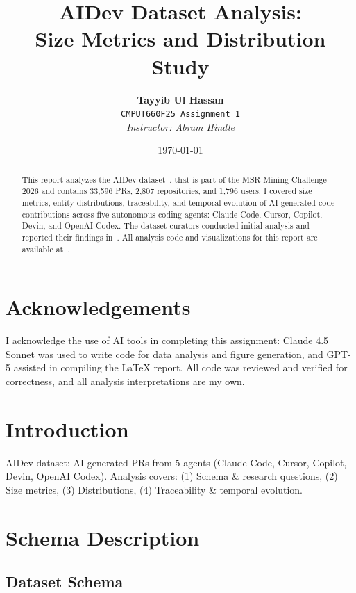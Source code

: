 \documentclass[11pt]{article}
\title{\textbf{AIDev Dataset Analysis:\\Size Metrics and Distribution Study}}
\author{
    \textbf{Tayyib Ul Hassan}\\
    \texttt{CMPUT660F25 Assignment 1}\\[0.5em]
    \textit{Instructor: Abram Hindle}
}
\date{\today}
\begin{document}
\maketitle

\begin{abstract}
This report analyzes the AIDev dataset~\cite{li2025aidev}, that is part of the MSR Mining Challenge 2026 and contains 33,596 PRs, 2,807 repositories, and 1,796 users. I covered size metrics, entity distributions, traceability, and temporal evolution of AI-generated code contributions across five autonomous coding agents: Claude Code, Cursor, Copilot, Devin, and OpenAI Codex. The dataset curators conducted initial analysis and reported their findings in~\cite{li2025riseaiteammates}. All analysis code and visualizations for this report are available at~\cite{githubRepo}.
\end{abstract}

\tableofcontents
\newpage

\section*{Acknowledgements}

I acknowledge the use of AI tools in completing this assignment: Claude 4.5 Sonnet was used to write code for data analysis and figure generation, and GPT-5 assisted in compiling the LaTeX report. All code was reviewed and verified for correctness, and all analysis interpretations are my own.

\newpage

\section{Introduction}

AIDev dataset: AI-generated PRs from 5 agents (Claude Code, Cursor, Copilot, Devin, OpenAI Codex). Analysis covers: (1) Schema \& research questions, (2) Size metrics, (3) Distributions, (4) Traceability \& temporal evolution.

\section{Schema Description}

\subsection{Dataset Schema}
\end{document}
